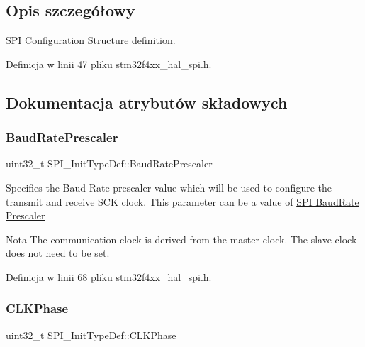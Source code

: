 \subsection{Opis szczegółowy}
S\+PI Configuration Structure definition. 

Definicja w linii 47 pliku stm32f4xx\+\_\+hal\+\_\+spi.\+h.



\subsection{Dokumentacja atrybutów składowych}
\mbox{\label{struct_s_p_i___init_type_def_a1d553f90738cb633a9298d2b4d306fde}} 
\subsubsection{\texorpdfstring{Baud\+Rate\+Prescaler}{BaudRatePrescaler}}
{\footnotesize\ttfamily uint32\+\_\+t S\+P\+I\+\_\+\+Init\+Type\+Def\+::\+Baud\+Rate\+Prescaler}

Specifies the Baud Rate prescaler value which will be used to configure the transmit and receive S\+CK clock. This parameter can be a value of \hyperlink{group___s_p_i___baud_rate___prescaler}{S\+PI Baud\+Rate Prescaler} \begin{DoxyNote}{Nota}
The communication clock is derived from the master clock. The slave clock does not need to be set. 
\end{DoxyNote}


Definicja w linii 68 pliku stm32f4xx\+\_\+hal\+\_\+spi.\+h.

\mbox{\label{struct_s_p_i___init_type_def_ab21a458209f2588f49a2353c56f62625}} 
\subsubsection{\texorpdfstring{C\+L\+K\+Phase}{CLKPhase}}
{\footnotesize\ttfamily uint32\+\_\+t S\+P\+I\+\_\+\+Init\+Type\+Def\+::\+C\+L\+K\+Phase}

